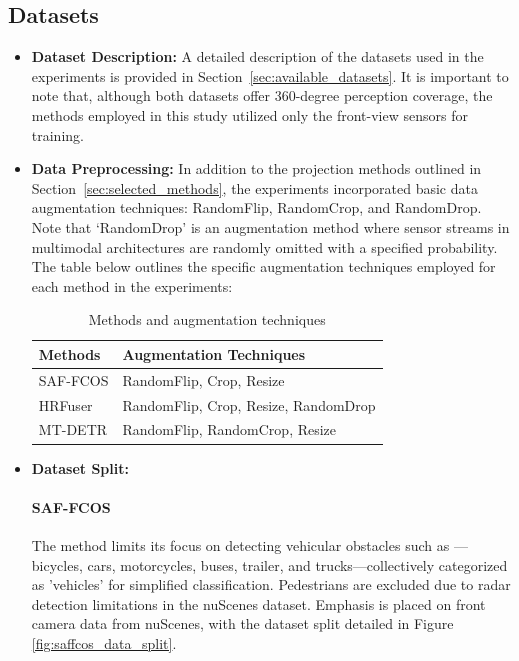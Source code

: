 \documentclass[report.tex]{subfiles}
\begin{document}
        \subsection{Datasets}
        \begin{itemize}
            \item \textbf{Dataset Description:} A detailed description of the datasets used in the experiments is provided in Section~\ref{sec:available_datasets}. It is important to note that, although both datasets offer 360-degree perception coverage, the methods employed in this study utilized only the front-view sensors for training.

            \item \textbf{Data Preprocessing:} In addition to the projection methods outlined in Section~\ref{sec:selected_methods}, the experiments incorporated basic data augmentation techniques: RandomFlip, RandomCrop, and RandomDrop. Note that `RandomDrop' is an augmentation method where sensor streams in multimodal architectures are randomly omitted with a specified probability. The table below outlines the specific augmentation techniques employed for each method in the experiments:
                \begin{table}[h]
                    \centering
                    \caption{Methods and augmentation techniques}
                    \begin{tabular}{|l|l|}
                    \hline
                    \textbf{Methods} & \textbf{Augmentation Techniques} \\ \hline
                    SAF-FCOS & RandomFlip, Crop, Resize \\ \hline
                    HRFuser & RandomFlip, Crop, Resize, RandomDrop \\ \hline
                    MT-DETR & RandomFlip, RandomCrop, Resize \\ \hline
                    \end{tabular}
                    \label{tab:methods_augmentation}
                \end{table}

            \item \textbf{Dataset Split:} 
            
            \paragraph*{SAF-FCOS}

            The method limits its focus on detecting vehicular obstacles such as — bicycles, cars, motorcycles, buses, trailer, and trucks—collectively categorized as 'vehicles' for simplified classification. Pedestrians are excluded due to radar detection limitations in the nuScenes dataset. Emphasis is placed on front camera data from nuScenes, with the dataset split detailed in Figure \ref{fig:saffcos_data_split}.


\end{itemize}
\end{document}
